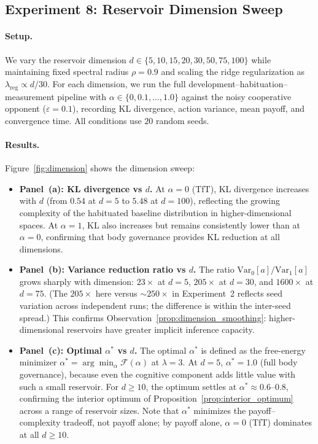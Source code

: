 \documentclass[11pt,a4paper]{article}
\theoremstyle{definition}
\newcommand{\Var}{\mathrm{Var}}
\newcommand{\FE}{\mathcal{F}}
\begin{document}
\subsection{Experiment 8: Reservoir Dimension Sweep}
\label{sec:exp_dimension}

\paragraph{Setup.}
We vary the reservoir dimension $d \in \{5, 10, 15, 20, 30, 50, 75, 100\}$
while maintaining fixed spectral radius $\rho = 0.9$ and scaling the
ridge regularization as $\lambda_{\mathrm{reg}} \propto d/30$.
For each dimension, we run the full development--habituation--measurement
pipeline with $\alpha \in \{0, 0.1, \ldots, 1.0\}$ against the noisy
cooperative opponent ($\varepsilon = 0.1$), recording KL divergence,
action variance, mean payoff, and convergence time.
All conditions use $20$ random seeds.

\paragraph{Results.}
Figure~\ref{fig:dimension} shows the dimension sweep:
\begin{itemize}[nosep]
  \item \textbf{Panel~(a): KL divergence vs $d$.}
    At $\alpha = 0$ (TfT), KL divergence increases with $d$ (from $0.54$
    at $d = 5$ to $5.48$ at $d = 100$), reflecting the growing complexity
    of the habituated baseline distribution in higher-dimensional spaces.
    At $\alpha = 1$, KL also increases but remains consistently lower than
    at $\alpha = 0$, confirming that body governance provides KL reduction
    at all dimensions.

  \item \textbf{Panel~(b): Variance reduction ratio vs $d$.}
    The ratio $\Var_0[a] / \Var_1[a]$ grows sharply with dimension:
    $23\times$ at $d = 5$, $205\times$ at $d = 30$, and $1600\times$ at
    $d = 75$.  (The $205\times$ here versus $\sim 250\times$ in
    Experiment~2 reflects seed variation across independent runs;
    the difference is within the inter-seed spread.)
    This confirms Observation~\ref{prop:dimension_smoothing}:
    higher-dimensional reservoirs have greater implicit inference capacity.

  \item \textbf{Panel~(c): Optimal $\alpha^{*}$ vs $d$.}
    The optimal $\alpha^{*}$ is defined as the free-energy minimizer
    $\alpha^{*} = \arg\min_\alpha \FE(\alpha)$ at $\lambda = 3$.
    At $d = 5$, $\alpha^{*} = 1.0$ (full body governance),
    because even the cognitive component adds little value
    with such a small reservoir.  For $d \geq 10$, the optimum settles
    at $\alpha^{*} \approx 0.6$--$0.8$, confirming the interior optimum
    of Proposition~\ref{prop:interior_optimum} across a range of
    reservoir sizes.  Note that $\alpha^{*}$ minimizes the
    payoff--complexity tradeoff, not payoff alone; by payoff alone,
    $\alpha = 0$ (TfT) dominates at all $d \geq 10$.
\end{itemize}
\end{document}
